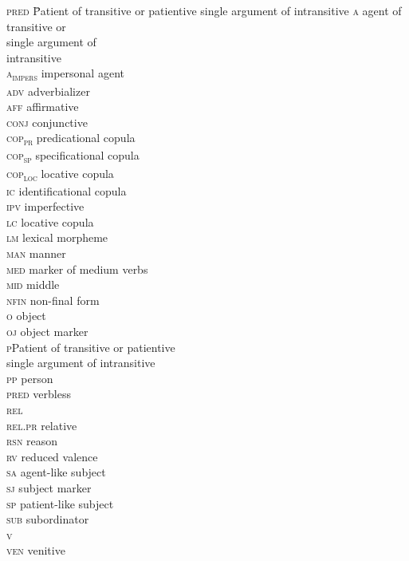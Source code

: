 \documentclass[output=paper,modfonts]{langscibook}
\begin{document}
\begin{multicols}{2}
 \begin{tabbing}
\textsc{pred}\hspace{1em} \= Patient of transitive  or patientive single argument of intransitive \kill
\textsc{a}\> agent of transitive  or\\ \>  single argument of \\ \> intransitive \\
\textsc{a}\textsc{\textsubscript{impers}} \> impersonal agent\\
\textsc{adv} \> adverbializer\\
\textsc{aff} \> affirmative\\
\textsc{conj}\> conjunctive\\
\textsc{cop}\textsc{\textsubscript{pr}}\> predicational copula\\
\textsc{cop}\textsc{\textsubscript{sp}}\> specificational copula\\
\textsc{cop}\textsc{\textsubscript{loc}}\> locative copula\\
\textsc{ic} \> identificational copula\\
\textsc{ipv} \> imperfective\\
\textsc{lc} \> locative copula\\
\textsc{lm} \> lexical morpheme\\
\textsc{man}\> manner\\
\textsc{med} \> marker of medium verbs\\
\textsc{mid}\> middle \\
\textsc{nfin}\> non-final  form\\
\textsc{o} \> object\\ 
\textsc{oj} \> object marker\\
\textsc{p}\>Patient of transitive  or patientive \\ \> single argument of intransitive \\
\textsc{pp} \> person \\
\textsc{pred} \> verbless \\
\textsc{rel}\>  \\
\textsc{rel}.\textsc{pr}\> relative \\
\textsc{rsn}\> reason \\
\textsc{rv} \> reduced valence\\
\textsc{sa} \> agent-like subject\\
\textsc{sj} \> subject marker\\
\textsc{sp} \> patient-like subject\\
\textsc{sub} \> subordinator\\
\textsc{v} \> \\
\textsc{ven}\> venitive
\end{tabbing}
\end{multicols}
 
{\sloppy
\printbibliography[heading=subbibliography,notkeyword=this]
}
\end{document}
